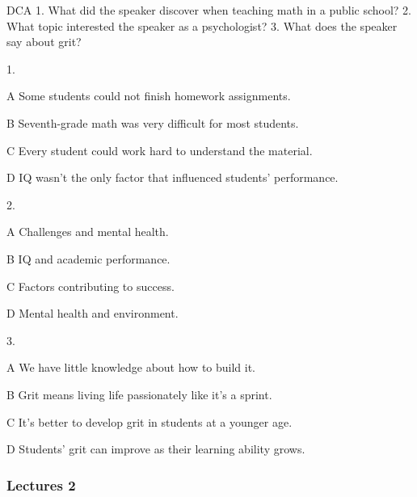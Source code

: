 \begin{enumerate}
	DCA
	1. What did the speaker discover when teaching math in a public school?
	2. What topic interested the speaker as a psychologist?
	3. What does the speaker say about grit?
	
	1.
	
	A
	Some students could not finish homework assignments.
	
	B
	Seventh-grade math was very difficult for most students.
	
	C
	Every student could work hard to understand the material.
	
	D
	IQ wasn't the only factor that influenced students' performance.
	
	2.
	
	A
	Challenges and mental health.
	
	B
	IQ and academic performance.
	
	C
	Factors contributing to success.
	
	D
	Mental health and environment.
	
	3.
	
	A
	We have little knowledge about how to build it.
	
	B
	Grit means living life passionately like it's a sprint.
	
	C
	It's better to develop grit in students at a younger age.
	
	D
	Students' grit can improve as their learning ability grows.
	
\end{enumerate}

\subsubsection{Lectures 2}

